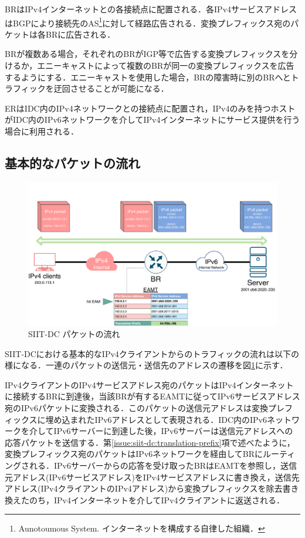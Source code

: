 BRはIPv4インターネットとの各接続点に配置される．各IPv4サービスアドレスはBGPにより接続先のAS\footnote{Aunotoumous System. インターネットを構成する自律した組織．}に対して経路広告される．変換プレフィックス宛のパケットは各BRに広告される．

BRが複数ある場合，それぞれのBRがIGP等で広告する変換プレフィックスを分けるか，エニーキャスト\cite{RFC4786}によって複数のBRが同一の変換プレフィックスを広告するようにする．エニーキャストを使用した場合，BRの障害時に別のBRへとトラフィックを迂回させることが可能になる．

ERはIDC内のIPv4ネットワークとの接続点に配置され，IPv4のみを持つホストがIDC内のIPv6ネットワークを介してIPv4インターネットにサービス提供を行う場合に利用される．


\subsection{基本的なパケットの流れ}
\label{issue:siit-dc:packet_flow}

\begin{figure}[h]
    \begin{center}
      \includegraphics[width=14cm,pagebox=cropbox,clip]{img/siit-dc_packet.pdf}
    \end{center}
    \caption{SIIT-DC パケットの流れ}
    \label{fig:siit-dc_packet}
\end{figure}

SIIT-DCにおける基本的なIPv4クライアントからのトラフィックの流れは以下の様になる．一連のパケットの送信元・送信先のアドレスの遷移を図\ref{fig:siit-dc_packet}に示す．

IPv4クライアントのIPv4サービスアドレス宛のパケットはIPv4インターネットに接続するBRに到達後，当該BRが有するEAMTに従ってIPv6サービスアドレス宛のIPv6パケットに変換される．このパケットの送信元アドレスは変換プレフィックスに埋め込まれたIPv6アドレスとして表現される．IDC内のIPv6ネットワークを介してIPv6サーバーに到達した後，IPv6サーバーは送信元アドレスへの応答パケットを送信する．第\ref{issue:siit-dc:translation-prefix}項で述べたように，変換プレフィックス宛のパケットはIPv6ネットワークを経由してBRにルーティングされる．IPv6サーバーからの応答を受け取ったBRはEAMTを参照し，送信元アドレス(IPv6サービスアドレス)をIPv4サービスアドレスに書き換え，送信先アドレス(IPv4クライアントのIPv4アドレス)から変換プレフィックスを除去書き換えたのち，IPv4インターネットを介してIPv4クライアントに返送される．




